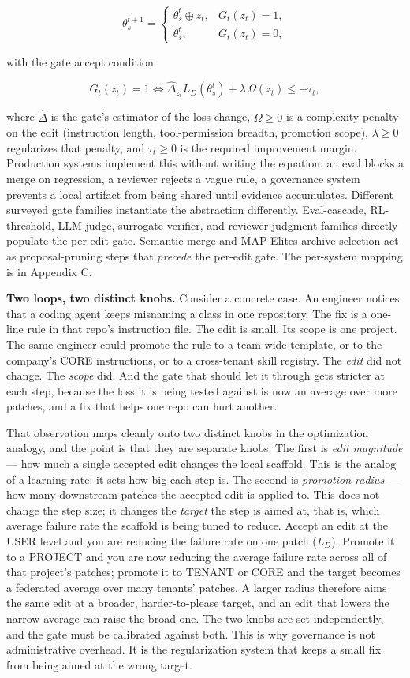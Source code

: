 \documentclass[
]{article}
\begin{document}
\[\theta_s^{t+1} = \begin{cases} \theta_s^t \oplus z_t, & G_t(z_t)=1, \\ \theta_s^t, & G_t(z_t)=0, \end{cases}\]

with the gate accept condition

\[G_t(z_t)=1 \iff \widehat{\Delta}_{z_t} L_D(\theta_s^t) + \lambda\,\Omega(z_t) \leq -\tau_t,\]

where \(\widehat{\Delta}\) is the gate's estimator of the loss change,
\(\Omega \geq 0\) is a complexity penalty on the edit (instruction
length, tool-permission breadth, promotion scope), \(\lambda \geq 0\)
regularizes that penalty, and \(\tau_t \geq 0\) is the required
improvement margin. Production systems implement this without writing
the equation: an eval blocks a merge on regression, a reviewer rejects a
vague rule, a governance system prevents a local artifact from being
shared until evidence accumulates. Different surveyed gate families
instantiate the abstraction differently. Eval-cascade, RL-threshold,
LLM-judge, surrogate verifier, and reviewer-judgment families directly
populate the per-edit gate. Semantic-merge and MAP-Elites archive
selection act as proposal-pruning steps that \emph{precede} the per-edit
gate. The per-system mapping is in Appendix C.

\textbf{Two loops, two distinct knobs.} Consider a concrete case. An
engineer notices that a coding agent keeps misnaming a class in one
repository. The fix is a one-line rule in that repo's instruction file.
The edit is small. Its scope is one project. The same engineer could
promote the rule to a team-wide template, or to the company's CORE
instructions, or to a cross-tenant skill registry. The \emph{edit} did
not change. The \emph{scope} did. And the gate that should let it
through gets stricter at each step, because the loss it is being tested
against is now an average over more patches, and a fix that helps one
repo can hurt another.

That observation maps cleanly onto two distinct knobs in the
optimization analogy, and the point is that they are separate knobs. The
first is \emph{edit magnitude} --- how much a single accepted edit
changes the local scaffold. This is the analog of a learning rate: it
sets how big each step is. The second is \emph{promotion radius} --- how
many downstream patches the accepted edit is applied to. This does not
change the step size; it changes the \emph{target} the step is aimed at,
that is, which average failure rate the scaffold is being tuned to
reduce. Accept an edit at the USER level and you are reducing the
failure rate on one patch (\(L_D\)). Promote it to a PROJECT and you are
now reducing the average failure rate across all of that project's
patches; promote it to TENANT or CORE and the target becomes a federated
average over many tenants' patches. A larger radius therefore aims the
same edit at a broader, harder-to-please target, and an edit that lowers
the narrow average can raise the broad one. The two knobs are set
independently, and the gate must be calibrated against both. This is why
governance is not administrative overhead. It is the regularization
system that keeps a small fix from being aimed at the wrong target.
\end{document}
